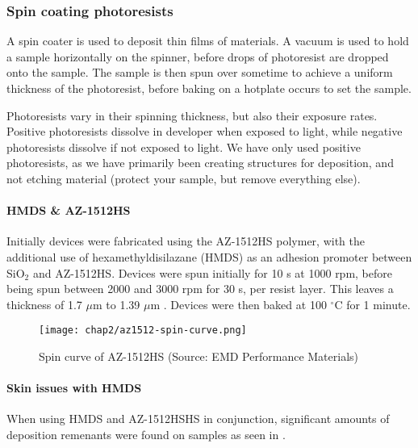 \documentclass[../../Matt_Gebert_Honours_Thesis.tex]{subfiles}
\begin{document}
	\subsubsection{Spin coating photoresists}\label{sec:resists}
	A spin coater is used to deposit thin films of materials. A vacuum is used to hold a sample horizontally on the spinner, before drops of photoresist are dropped onto the sample. The sample is then spun over sometime to achieve a uniform thickness of the photoresist, before baking on a hotplate occurs to set the sample.
	
	Photoresists vary in their spinning thickness, but also their exposure rates. Positive photoresists dissolve in developer when exposed to light, while negative photoresists dissolve if not exposed to light. We have only used positive photoresists, as we have primarily been creating structures for deposition, and not etching material (protect your sample, but remove everything else).
	
	\paragraph{HMDS \& AZ-1512HS}
	Initially devices were fabricated using the AZ-1512HS polymer, with the additional use of hexamethyldisilazane (HMDS) as an adhesion promoter between SiO$_2$ and AZ-1512HS. Devices were spun initially for 10 s at 1000 rpm, before being spun between 2000 and 3000 rpm for 30 s, per resist layer. This leaves a thickness of 1.7 $\mu$m to 1.39 $\mu$m \cite{az1500_series}.
	Devices were then baked at 100 $^\circ$C for 1 minute.
	
	\begin{figure}[H]\label{fig:spin_curve_AZ-1512HS}
		\centering
		\texttt{[image: chap2/az1512-spin-curve.png]}
		\caption{Spin curve of AZ-1512HS (Source: EMD Performance Materials\cite{az1500_series_spincurve})}
	\end{figure}
	
	\paragraph{Skin issues with HMDS}\label{sec:sin_issues}
	When using HMDS and AZ-1512HSHS in conjunction, significant amounts of deposition remenants were found on samples as seen in .%
	
\end{document}
